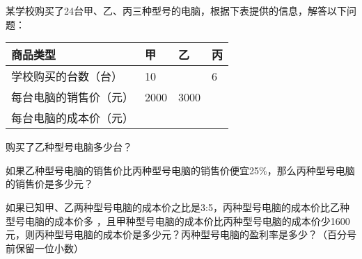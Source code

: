 某学校购买了24台甲、乙、丙三种型号的电脑，根据下表提供的信息，解答以下问题：\\

\begin{center}

    \begin{tabular}{|p{4cm}<{\centering}|p{2cm}<{\centering}|p{2cm}<{\centering}|p{2cm}<{\centering}|}

         \hline

         商品类型&甲&乙&丙 \\

         \hline

        学校购买的台数（台）&10&&6 \\

        \hline

        每台电脑的销售价（元）&2000&3000& \\

        \hline

        每台电脑的成本价（元）&&&\\

        \hline

    \end{tabular}

\end{center}



\begin{subquestions}

    \subquestion 购买了乙种型号电脑多少台？

    \subquestion 如果乙种型号电脑的销售价比丙种型号电脑的销售价便宜25$\%$，那么丙种型号电脑的销售价是多少元？

    \subquestion 如果已知甲、乙两种型号电脑的成本价之比是3:5，丙种型号电脑的成本价比乙种型号电脑的成本价多 ，且甲种型号电脑的成本价比丙种型号电脑的成本价少1600元，则丙种型号电脑的成本价是多少元？丙种型号电脑的盈利率是多少？（百分号前保留一位小数）

\end{subquestions}



